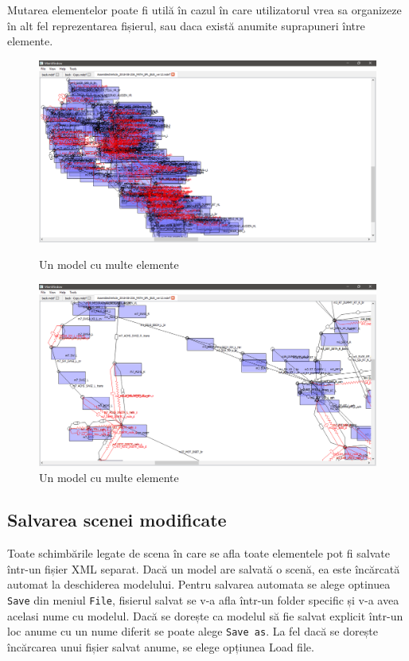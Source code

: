 Mutarea elementelor poate fi utilă în cazul în care utilizatorul vrea sa organizeze în alt fel reprezentarea fișierul, sau daca există
anumite suprapuneri între elemente.\newline 

\begin{figure}[H]
    \includegraphics[width=\linewidth]{imagini/implementare/bigmodel.png}
    \caption{Un model cu multe elemente}
    \label{fig:tabs}

    \includegraphics[width=\linewidth]{imagini/implementare/bigmodelzoom.png}
    \caption{Un model cu multe elemente}
    \label{fig:tabs}
\end{figure}

\subsection{Salvarea scenei modificate}
Toate schimbările legate de scena în care se afla toate elementele pot fi salvate într-un fișier XML separat. 
Dacă un model are salvată o scenă, ea este încărcată automat la deschiderea modelului.
Pentru salvarea automata se alege optinuea \verb|Save| din meniul \verb|File|, fisierul salvat se v-a afla într-un folder specific și v-a avea acelasi nume cu modelul.
Dacă se dorește ca modelul să fie salvat explicit într-un loc anume cu un nume diferit se poate alege \verb|Save as|. La fel dacă se dorește 
încărcarea unui fișier salvat anume, se elege opțiunea Load file.

